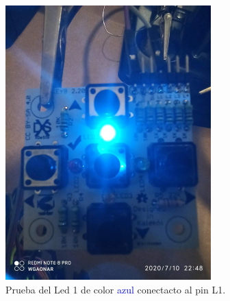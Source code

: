 \documentclass{article}
\begin{document}
\begin{figure}[H]
    \centering
    \begin{subfigure}[t]{0.3\textwidth}
        \centering
        \includegraphics[width=0.9\columnwidth, height=1.2\columnwidth]{images/Botonera/botonera_ensambleLed_1.png}
        \caption{Prueba del Led 1 de color \textcolor{blue}{azul} conectacto al pin L1.}
        \label{fig:botonera_ensambleLed_1}
    \end{subfigure}%
    \begin{subfigure}[t]{0.3\textwidth}
        \centering

\end{subfigure}
\end{figure}
\end{document}
